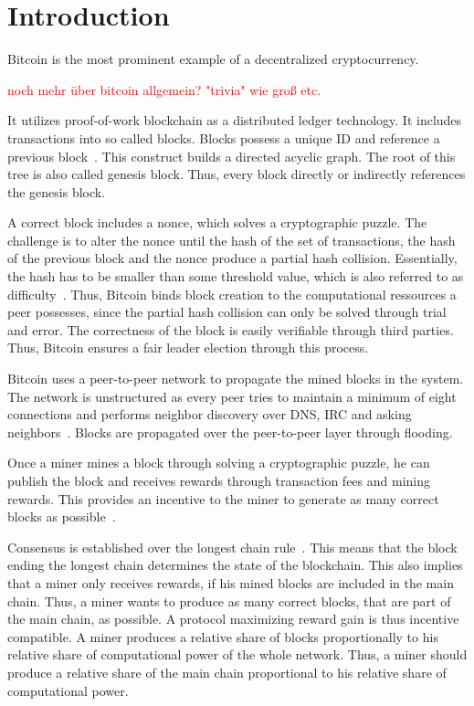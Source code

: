 \chapter{Introduction}\label{chap:introduction}
Bitcoin is the most prominent example of a decentralized cryptocurrency. 

\textcolor{red}{noch mehr über bitcoin allgemein? "trivia" wie groß etc.	}

It utilizes proof-of-work blockchain as a distributed ledger technology.
It includes transactions into so called blocks. Blocks possess a unique ID and reference a previous block~\citeauthor{tschorsch}. This construct builds a directed acyclic graph. The root of this tree is also called genesis block. Thus, every block directly or indirectly references the genesis block.


A correct block includes a nonce, which solves a cryptographic puzzle. The challenge is to alter the nonce until the hash of the set of transactions, the hash of the previous block and the nonce produce a partial hash collision. Essentially, the hash has to be smaller than some threshold value, which is also referred to as difficulty~\citeauthor{tschorsch}.
Thus, Bitcoin binds block creation to the computational ressources a peer possesses, since the partial hash collision can only be solved through trial and error. The correctness of the block is easily verifiable through third parties. Thus, Bitcoin ensures a fair leader election through this process.

Bitcoin uses a peer-to-peer network to propagate the mined blocks in the system. The network is unstructured as every peer tries to maintain a minimum of eight connections and performs neighbor discovery over DNS, IRC and asking neighbors~\citeauthor{tschorsch}. Blocks are propagated over the peer-to-peer layer through flooding.

Once a miner mines a block through solving a cryptographic puzzle, he can publish the block and receives rewards through transaction fees and mining rewards. This provides an incentive to the miner to generate as many correct blocks as possible~\citeauthor{1}.

Consensus is established over the longest chain rule~\citeauthor{1}. This means that the block ending the longest chain determines the state of the blockchain. This also implies that a miner only receives rewards, if his mined blocks are included in the main chain. Thus, a miner wants to produce as many correct blocks, that are part of the main chain, as possible. A protocol maximizing reward gain is thus incentive compatible.
A miner produces a relative share of blocks proportionally to his relative share of computational power of the whole network. Thus, a miner should produce a relative share of the main chain proportional to his relative share of computational power.

